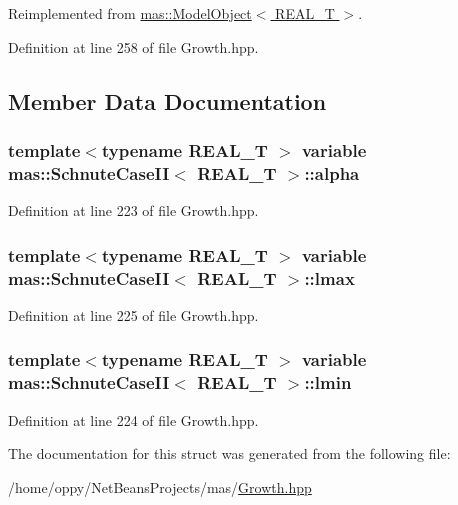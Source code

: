 Reimplemented from \hyperlink{structmas_1_1_model_object_a8eaf6c7c52e42ea8869aefa318358cb5}{mas\-::\-Model\-Object$<$ R\-E\-A\-L\-\_\-\-T $>$}.



Definition at line 258 of file Growth.\-hpp.



\subsection{Member Data Documentation}
\hypertarget{structmas_1_1_schnute_case_i_i_aab10fd7b8522029960059666e872c461}{
\subsubsection[{alpha}]{\setlength{\rightskip}{0pt plus 5cm}template$<$typename R\-E\-A\-L\-\_\-\-T $>$ {\bf variable} {\bf mas\-::\-Schnute\-Case\-I\-I}$<$ R\-E\-A\-L\-\_\-\-T $>$\-::alpha}}\label{structmas_1_1_schnute_case_i_i_aab10fd7b8522029960059666e872c461}


Definition at line 223 of file Growth.\-hpp.

\hypertarget{structmas_1_1_schnute_case_i_i_a2f33253a32b5b0680cbacfa1f5e29f64}{
\subsubsection[{lmax}]{\setlength{\rightskip}{0pt plus 5cm}template$<$typename R\-E\-A\-L\-\_\-\-T $>$ {\bf variable} {\bf mas\-::\-Schnute\-Case\-I\-I}$<$ R\-E\-A\-L\-\_\-\-T $>$\-::lmax}}\label{structmas_1_1_schnute_case_i_i_a2f33253a32b5b0680cbacfa1f5e29f64}


Definition at line 225 of file Growth.\-hpp.

\hypertarget{structmas_1_1_schnute_case_i_i_ab7ff973aeb99b0e7f714ba5bdefcba10}{
\subsubsection[{lmin}]{\setlength{\rightskip}{0pt plus 5cm}template$<$typename R\-E\-A\-L\-\_\-\-T $>$ {\bf variable} {\bf mas\-::\-Schnute\-Case\-I\-I}$<$ R\-E\-A\-L\-\_\-\-T $>$\-::lmin}}\label{structmas_1_1_schnute_case_i_i_ab7ff973aeb99b0e7f714ba5bdefcba10}


Definition at line 224 of file Growth.\-hpp.



The documentation for this struct was generated from the following file\-:\begin{DoxyCompactItemize}
\item 
/home/oppy/\-Net\-Beans\-Projects/mas/\hyperlink{_growth_8hpp}{Growth.\-hpp}\end{DoxyCompactItemize}
